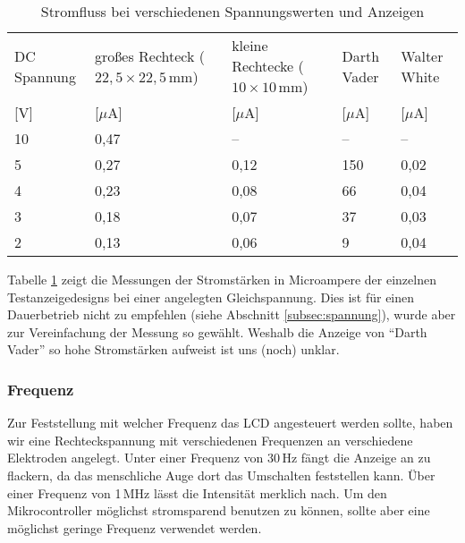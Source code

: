 \begin{table}[]
	\centering
	\caption{Stromfluss bei verschiedenen Spannungswerten und Anzeigen}
	\label{my-label}
	\begin{tabular}{p{1.2cm}|p{1.2cm}|p{1.2cm}|p{1.2cm}|p{1.2cm}}
		DC Spannung & großes Rechteck (\(22,5\times22,5\,\textrm{mm}\)) & kleine Rechtecke (\(10\times10\,\textrm{mm}\)) & Darth Vader & Walter White    \\
        {[}V{]} & {[}$\mu$A{]} & {[}$\mu$A{]} & {[}$\mu$A{]} & {[}$\mu$A{]} \\
         \hline
		10 & 0,47 & -- & --  & --   \\ \hline
		5  & 0,27 & 0,12 & 150 & 0,02 \\ \hline
		4  & 0,23 & 0,08 & 66  & 0,04 \\ \hline
		3  & 0,18 & 0,07 & 37  & 0,03 \\ \hline
		2  & 0,13 & 0,06 & 9   & 0,04 \\
	\end{tabular}
	\label{tab:volt}
\end{table}

Tabelle \ref{tab:volt} zeigt die Messungen der Stromstärken in Microampere der einzelnen Testanzeigedesigns bei einer angelegten Gleichspannung. Dies ist für einen Dauerbetrieb nicht zu empfehlen (siehe Abschnitt \ref{subsec:spannung}), wurde aber zur Vereinfachung der Messung so gewählt. Weshalb die Anzeige von “Darth Vader” so hohe Stromstärken aufweist ist uns (noch) unklar.

\subsubsection{Frequenz}
Zur Feststellung mit welcher Frequenz das LCD angesteuert werden sollte, haben wir eine Rechteckspannung mit verschiedenen Frequenzen an verschiedene Elektroden angelegt. Unter einer Frequenz von 30\,Hz fängt die Anzeige an zu flackern, da das menschliche Auge dort das Umschalten feststellen kann. Über einer Frequenz von 1\,MHz lässt die Intensität merklich nach. Um den Mikrocontroller möglichst stromsparend benutzen zu können, sollte aber eine möglichst geringe Frequenz verwendet werden.

